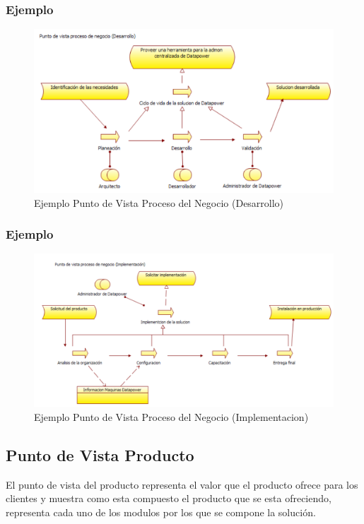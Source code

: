 \subsubsection{Ejemplo}
    \begin{figure}[th!]
        \centering
        \includegraphics[width=1.0\textwidth]{Arquitectura/images/Punto_de_Vista_de_Proceso_de_Negocio_Desarrollo.pdf}
        \caption{Ejemplo Punto de Vista Proceso del Negocio (Desarrollo)}
    \end{figure}
\newpage
\subsubsection{Ejemplo}
    \begin{figure}[th!]
        \centering
        \includegraphics[width=1.0\textwidth]{Arquitectura/images/Punto_de_Vista_de_Proceso_de_Negocio_Implementacion.pdf}
        \caption{Ejemplo Punto de Vista Proceso del Negocio (Implementacion)}
    \end{figure}
\newpage

\subsection{Punto de Vista Producto}
El punto de vista del producto representa el valor que el producto ofrece para los clientes y muestra como esta compuesto el producto que se esta ofreciendo, representa cada uno de los modulos por los que se compone la solución.
